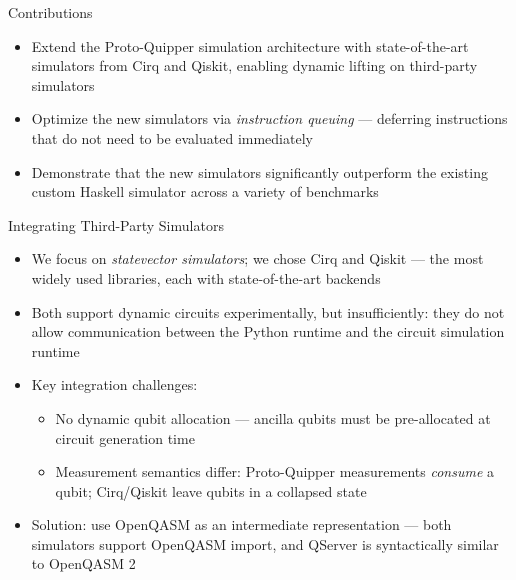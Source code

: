 \documentclass{beamer}
\begin{document}
\begin{frame}{Contributions}
  \begin{itemize}
    \item Extend the Proto-Quipper simulation architecture with state-of-the-art simulators from Cirq and Qiskit, enabling dynamic lifting on third-party simulators
    \item Optimize the new simulators via \emph{instruction queuing} --- deferring instructions that do not need to be evaluated immediately
    \item Demonstrate that the new simulators significantly outperform the existing custom Haskell simulator across a variety of benchmarks
  \end{itemize}
\end{frame}

\begin{frame}{Integrating Third-Party Simulators}
  \begin{itemize}
    \item We focus on \emph{statevector simulators}; we chose Cirq and Qiskit --- the most widely used libraries, each with state-of-the-art backends~\cite{jamadagni2024benchmarking}
    \item Both support dynamic circuits experimentally, but insufficiently: they do not allow communication between the Python runtime and the circuit simulation runtime
    \item Key integration challenges:
    \begin{itemize}
      \item No dynamic qubit allocation --- ancilla qubits must be pre-allocated at circuit generation time
      \item Measurement semantics differ: Proto-Quipper measurements \emph{consume} a qubit; Cirq/Qiskit leave qubits in a collapsed state
    \end{itemize}
    \item Solution: use OpenQASM as an intermediate representation --- both simulators support OpenQASM import, and QServer is syntactically similar to OpenQASM 2
  \end{itemize}
\end{frame}
\end{document}
